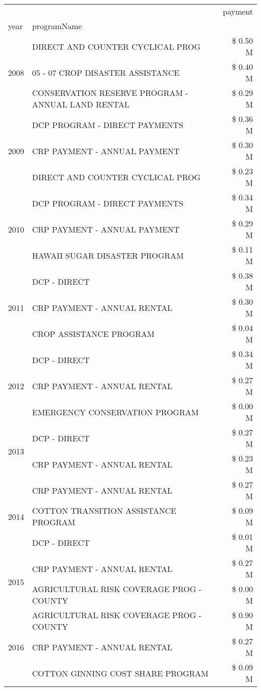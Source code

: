 \begin{tabular}{llr}
\toprule
 &  & payment \\
year & programName &  \\
\midrule
\multirow[t]{3}{*}{2008} & DIRECT AND COUNTER CYCLICAL PROG & \$ 0.50 M \\
 & 05 - 07 CROP DISASTER ASSISTANCE & \$ 0.40 M \\
 & CONSERVATION RESERVE PROGRAM - ANNUAL LAND RENTAL & \$ 0.29 M \\
\cline{1-3}
\multirow[t]{3}{*}{2009} & DCP PROGRAM - DIRECT PAYMENTS & \$ 0.36 M \\
 & CRP PAYMENT - ANNUAL PAYMENT & \$ 0.30 M \\
 & DIRECT AND COUNTER CYCLICAL PROG & \$ 0.23 M \\
\cline{1-3}
\multirow[t]{3}{*}{2010} & DCP PROGRAM - DIRECT PAYMENTS & \$ 0.34 M \\
 & CRP PAYMENT - ANNUAL PAYMENT & \$ 0.29 M \\
 & HAWAII SUGAR DISASTER PROGRAM & \$ 0.11 M \\
\cline{1-3}
\multirow[t]{3}{*}{2011} & DCP - DIRECT & \$ 0.38 M \\
 & CRP PAYMENT - ANNUAL RENTAL & \$ 0.30 M \\
 & CROP ASSISTANCE PROGRAM & \$ 0.04 M \\
\cline{1-3}
\multirow[t]{3}{*}{2012} & DCP - DIRECT & \$ 0.34 M \\
 & CRP PAYMENT - ANNUAL RENTAL & \$ 0.27 M \\
 & EMERGENCY CONSERVATION PROGRAM & \$ 0.00 M \\
\cline{1-3}
\multirow[t]{2}{*}{2013} & DCP - DIRECT & \$ 0.27 M \\
 & CRP PAYMENT - ANNUAL RENTAL & \$ 0.23 M \\
\cline{1-3}
\multirow[t]{3}{*}{2014} & CRP PAYMENT - ANNUAL RENTAL & \$ 0.27 M \\
 & COTTON TRANSITION ASSISTANCE PROGRAM & \$ 0.09 M \\
 & DCP - DIRECT & \$ 0.01 M \\
\cline{1-3}
\multirow[t]{2}{*}{2015} & CRP PAYMENT - ANNUAL RENTAL & \$ 0.27 M \\
 & AGRICULTURAL RISK COVERAGE PROG - COUNTY & \$ 0.00 M \\
\cline{1-3}
\multirow[t]{3}{*}{2016} & AGRICULTURAL RISK COVERAGE PROG - COUNTY & \$ 0.90 M \\
 & CRP PAYMENT - ANNUAL RENTAL & \$ 0.27 M \\
 & COTTON GINNING COST SHARE PROGRAM & \$ 0.09 M \\

\end{tabular}
